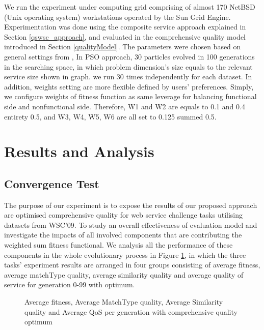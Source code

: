 \documentclass{llncs}
\begin{document}
We run the experiment under computing grid comprising of almost 170 NetBSD (Unix operating system) workstations operated by the Sun Grid Engine. Experimentation was done using the composite service approach explained in Section \ref{qswsc_approach}, and evaluated in the comprehensive quality model introduced in Section \ref{qualityModel}. The parameters were chosen based on general settings from \cite{shi2001particle}, In PSO approach, 30 particles evolved in 100 generations in the searching space, in which problem dimension's size equals to the relevant service size shown in graph. we run 30 times independently for each dataset. In addition, weights setting are more flexible defined by users' preferences. Simply, we configure weights of fitness function as same leverage for balancing functional side and nonfunctional side. Therefore, W1 and W2 are equals to 0.1 and 0.4 entirety 0.5,  and W3, W4, W5, W6 are all set to 0.125 summed 0.5.

\section{Results and Analysis}\label{results_analysis}
\subsection{Convergence Test}\label{convergenceTest}
The purpose of our experiment is to expose the results of our proposed approach are optimised comprehensive quality for web service challenge tasks utilising datasets from WSC’09. To study an overall effectiveness of evaluation model and investigate the impacts of all involved components that are contributing the weighted sum fitness functional. We analysis all the performance of these components in the whole evolutionary process in Figure \ref{exp_fitnessvalue}, in which the three tasks' experiment results are arranged in four groups consisting of average fitness, average matchType quality, average similarity quality and average quality of service for generation 0-99 with optimum.
\begin{figure}[h]
\centerline{
}
 \caption{Average fitness, Average MatchType quality, Average Similarity quality and Average QoS per generation with comprehensive quality optimum}
 \label{exp_fitnessvalue}
\end{figure}
\end{document}
